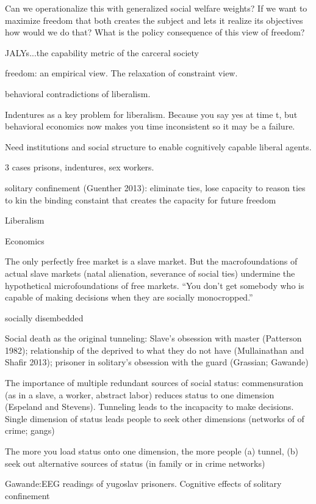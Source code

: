 \documentclass[10pt,a4paper]{article}
\begin{document}
Can we operationalize this with generalized social welfare weights? If we want to maximize freedom that both creates the
subject and lets it realize its objectives how would we do that? What is the policy consequence of this view of freedom?

JALYs...the capability metric of the carceral society


freedom: an empirical view. The relaxation of constraint view.

behavioral contradictions of liberalism.

Indentures as a key problem for liberalism. Because you say yes at time t, but behavioral economics now makes you time inconsistent
so it may be a failure.

Need institutions and social structure to enable cognitively capable liberal agents.

3 cases
prisons, indentures, sex workers.

solitary confinement (Guenther 2013): eliminate ties, lose capacity to reason
ties to kin the binding constaint that creates the capacity for future freedom

Liberalism



Economics
 
 The only perfectly free market is a slave market. But the macrofoundations of actual slave markets 
 (natal alienation, severance of social ties) undermine the hypothetical microfoundations of free markets. 
 ``You don't get somebody who is capable of making decisions when they are socially monocropped.''
 
 socially disembedded
 
 Social death as the original tunneling: Slave's obsession with master (Patterson 1982); 
 relationship of the deprived to what they do not have (Mullainathan and Shafir 2013); prisoner 
 in solitary's obsession with the guard (Grassian; Gawande)
 
 The importance of multiple redundant sources of social status: commensuration (as in a slave, a worker, 
 abstract labor) reduces status to one dimension (Espeland and Stevens). Tunneling leads to the incapacity 
 to make decisions. Single dimension of status leads people to seek other dimensions (networks of 
 of crime; gangs) 
 
 The more you load status onto one dimension, the more people (a) tunnel, (b) seek out alternative
 sources of status (in family or in crime networks)
 
 
 Gawande:EEG readings of yugoslav prisoners. Cognitive effects of solitary confinement
 
\end{document}
